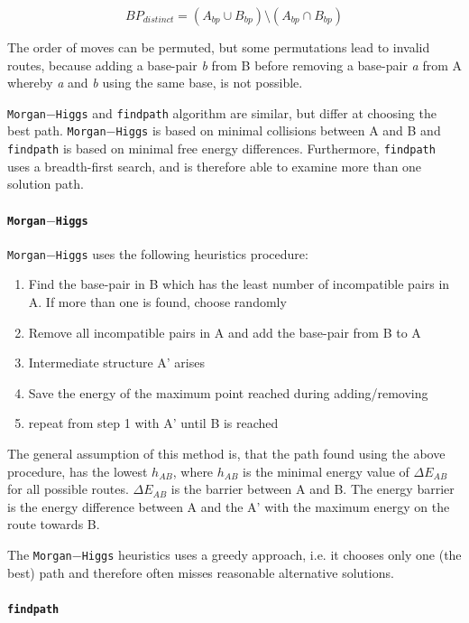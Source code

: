 \documentclass[ twoside,openright,titlepage,numbers=noenddot,headinclude,%
                footinclude=false, cleardoublepage=empty,abstractoff, %
                BCOR=5mm,paper=a4,fontsize=11pt,%
                ngerman,american,%
                ]{scrreprt}
\begin{document}
\begin{equation}
BP_{distinct} = (A_{bp} \cup B_{bp}) \setminus (A_{bp} \cap B_{bp})
\label{eq:bpDistinct}
\end{equation}

The order of moves can be permuted, but some permutations lead to invalid routes, because adding a base-pair \textit{b} from B before removing a base-pair \textit{a} from A whereby \textit{a} and \textit{b} using the same base, is not possible. 

\texttt{Morgan$-$Higgs} and \texttt{findpath} algorithm are similar, but differ at
choosing the best path. \texttt{Morgan$-$Higgs} is based on minimal
collisions between A and B and \texttt{findpath} is based on minimal free energy
differences. Furthermore, \texttt{findpath} uses a breadth-first search, and is
therefore able to examine more than one solution path.


\paragraph{\texttt{Morgan$-$Higgs} \cite{morganhiggs}}

\texttt{Morgan$-$Higgs} uses the following heuristics procedure: 
\begin{enumerate}
\item Find the base-pair in B which has the least number of incompatible pairs in A. If more than one is found, choose randomly
\item Remove all incompatible pairs in A and add the base-pair from B to A
\item Intermediate structure A' arises
\item Save the energy of the maximum point reached during adding/removing
\item repeat from step 1 with A' until B is reached
\end{enumerate} 

The general assumption of this method is, that the path found using the
above procedure, has the lowest $h_{AB}$, where $h_{AB}$ is the minimal
energy value of $\Delta E_{AB}$ for all possible routes. $\Delta E_{AB}$
is the barrier between A and B. The energy barrier is the energy difference
between A and the A' with the maximum energy on the route towards B.

The \texttt{Morgan$-$Higgs} heuristics uses a greedy approach, i.e. it
chooses only one (the best) path and therefore often misses reasonable alternative solutions.

\paragraph{\texttt{findpath} \cite{Flamm:2000}}
\end{document}
